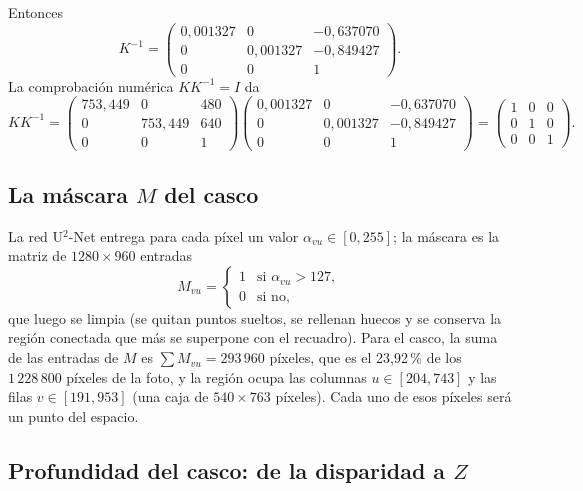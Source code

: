 Entonces
\begin{equation}
K^{-1}=\begin{pmatrix} 0{,}001327 & 0 & -0{,}637070 \\ 0 & 0{,}001327 & -0{,}849427 \\ 0 & 0 & 1 \end{pmatrix} .
\end{equation}
La comprobación numérica $KK^{-1}=I$ da
\begin{equation}
KK^{-1}=\begin{pmatrix} 753{,}449 & 0 & 480 \\ 0 & 753{,}449 & 640 \\ 0 & 0 & 1 \end{pmatrix}\begin{pmatrix} 0{,}001327 & 0 & -0{,}637070 \\ 0 & 0{,}001327 & -0{,}849427 \\ 0 & 0 & 1 \end{pmatrix}=\begin{pmatrix} 1 & 0 & 0 \\ 0 & 1 & 0 \\ 0 & 0 & 1 \end{pmatrix} .
\end{equation}

\subsection{La máscara $M$ del casco}\label{sec:casco-mascara}

La red U$^2$-Net entrega para cada píxel un valor $\alpha_{vu}\in[0,255]$; la máscara es la matriz de $1280\times960$ entradas
\begin{equation}
M_{vu}=\begin{cases}1&\text{si }\alpha_{vu}>127,\\0&\text{si no,}\end{cases}
\end{equation}
que luego se limpia (se quitan puntos sueltos, se rellenan huecos y se conserva la región conectada que más se
superpone con el recuadro). Para el casco, la suma de las entradas de $M$ es
$\sum M_{vu}=293\,960$ píxeles, que es el 23{,}92\,\% de los $1\,228\,800$ píxeles de la foto, y la región ocupa las columnas
$u\in[204,743]$ y las filas $v\in[191,953]$ (una caja de $540\times763$ píxeles). Cada uno de esos píxeles
será un punto del espacio.

\subsection{Profundidad del casco: de la disparidad a $Z$}\label{sec:casco-profundidad}

